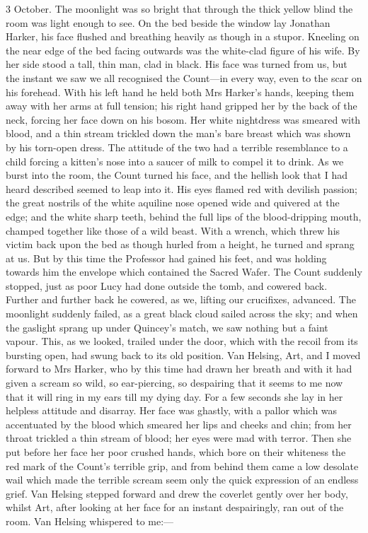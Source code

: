 \begin{diary}{3 October.}
The moonlight was so bright that through the thick yellow blind the room was light enough to see. On the bed beside the window lay Jonathan Harker, his face flushed and breathing heavily as though in a stupor. Kneeling on the near edge of the bed facing outwards was the white-clad figure of his wife. By her side stood a tall, thin man, clad in black. His face was turned from us, but the instant we saw we all recognised the Count—in every way, even to the scar on his forehead. With his left hand he held both Mrs Harker's hands, keeping them away with her arms at full tension; his right hand gripped her by the back of the neck, forcing her face down on his bosom. Her white nightdress was smeared with blood, and a thin stream trickled down the man's bare breast which was shown by his torn-open dress. The attitude of the two had a terrible resemblance to a child forcing a kitten's nose into a saucer of milk to compel it to drink. As we burst into the room, the Count turned his face, and the hellish look that I had heard described seemed to leap into it. His eyes flamed red with devilish passion; the great nostrils of the white aquiline nose opened wide and quivered at the edge; and the white sharp teeth, behind the full lips of the blood-dripping mouth, champed together like those of a wild beast. With a wrench, which threw his victim back upon the bed as though hurled from a height, he turned and sprang at us. But by this time the Professor had gained his feet, and was holding towards him the envelope which contained the Sacred Wafer. The Count suddenly stopped, just as poor Lucy had done outside the tomb, and cowered back. Further and further back he cowered, as we, lifting our crucifixes, advanced. The moonlight suddenly failed, as a great black cloud sailed across the sky; and when the gaslight sprang up under Quincey's match, we saw nothing but a faint vapour. This, as we looked, trailed under the door, which with the recoil from its bursting open, had swung back to its old position. Van Helsing, Art, and I moved forward to Mrs Harker, who by this time had drawn her breath and with it had given a scream so wild, so ear-piercing, so despairing that it seems to me now that it will ring in my ears till my dying day. For a few seconds she lay in her helpless attitude and disarray. Her face was ghastly, with a pallor which was accentuated by the blood which smeared her lips and cheeks and chin; from her throat trickled a thin stream of blood; her eyes were mad with terror. Then she put before her face her poor crushed hands, which bore on their whiteness the red mark of the Count's terrible grip, and from behind them came a low desolate wail which made the terrible scream seem only the quick expression of an endless grief. Van Helsing stepped forward and drew the coverlet gently over her body, whilst Art, after looking at her face for an instant despairingly, ran out of the room. Van Helsing whispered to me:—


\end{diary}
